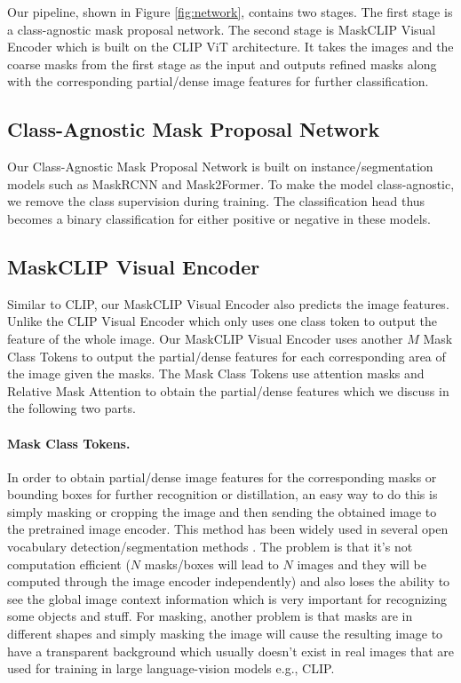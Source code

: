 \documentclass{article}
\theoremstyle{plain}
\theoremstyle{definition}
\theoremstyle{remark}
\begin{document}
Our pipeline, shown in Figure \ref{fig:network}, contains two stages. The first stage is a class-agnostic mask proposal network. The second stage is MaskCLIP Visual Encoder which is built on the CLIP \citep{CLIP} ViT architecture. It takes the images and the coarse masks from the first stage as the input and outputs refined masks along with the corresponding partial/dense image features for further classification.
{
\subsection{Class-Agnostic Mask Proposal Network}

Our Class-Agnostic Mask Proposal Network is built on instance/segmentation models such as MaskRCNN\citep{he2017mask} and Mask2Former\citep{cheng2021masked}. To make the model class-agnostic, we remove the class supervision during training. The classification head thus becomes a binary classification for either positive or negative in these models.

\subsection{MaskCLIP Visual Encoder}

Similar to CLIP, our MaskCLIP Visual Encoder also predicts the image features. Unlike the CLIP Visual Encoder which only uses one class token to output the feature of the whole image. Our MaskCLIP Visual Encoder uses another $M$ Mask Class Tokens to output the partial/dense features for each corresponding area of the image given the masks. The Mask Class Tokens use attention masks and Relative Mask Attention to obtain the partial/dense features which we discuss in the following two parts.
}
\label{sec:masktokens}
\paragraph{Mask Class Tokens.} In order to obtain partial/dense image features for the corresponding masks or bounding boxes for further recognition or distillation, an easy way to do this is simply masking or cropping the image and then sending the obtained image to the pretrained image encoder. This method has been widely used in several open vocabulary detection/segmentation methods \citep{zhong2021regionclip, gu2022open, xu2022simple}. The problem is that it's not computation efficient ($N$ masks/boxes will lead to $N$ images and they will be computed through the image encoder independently) and also loses the ability to see the global image context information which is very important for recognizing some objects and stuff. For masking, another problem is that masks are in different shapes and simply masking the image will cause the resulting image to have a transparent background which usually doesn't exist in real images that are used for training in large language-vision models e.g., CLIP.
\end{document}
